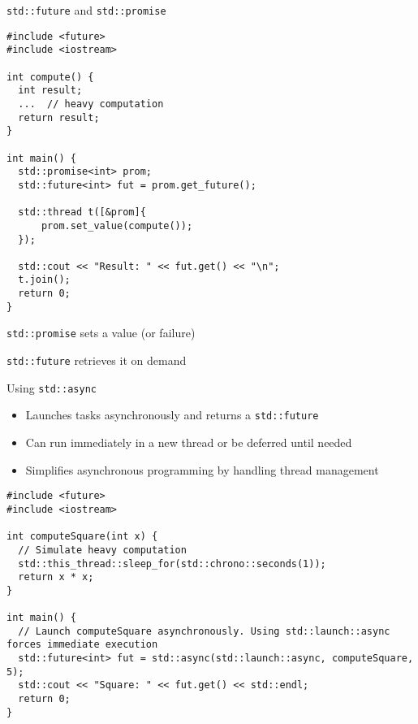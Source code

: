 \documentclass{beamer}
\begin{document}
\begin{frame}[fragile]{\texttt{std::future} and \texttt{std::promise}}
  \lstset{style=CStyle}
  \begin{lstlisting}
#include <future>
#include <iostream>

int compute() {
  int result;
  ...  // heavy computation
  return result;
}

int main() {
  std::promise<int> prom;
  std::future<int> fut = prom.get_future();

  std::thread t([&prom]{
      prom.set_value(compute());
  });

  std::cout << "Result: " << fut.get() << "\n";
  t.join();
  return 0;
}
  \end{lstlisting}

  \texttt{std::promise} sets a value (or failure)

  \texttt{std::future} retrieves it on demand
\end{frame}

\begin{frame}[fragile]{Using \texttt{std::async}}
  \begin{itemize}
    \item Launches tasks asynchronously and returns a \texttt{std::future}
    \item Can run immediately in a new thread or be deferred until needed
    \item Simplifies asynchronous programming by handling thread management
  \end{itemize}
  \lstset{style=CStyle}
  \begin{lstlisting}
#include <future>
#include <iostream>

int computeSquare(int x) {
  // Simulate heavy computation
  std::this_thread::sleep_for(std::chrono::seconds(1));
  return x * x;
}

int main() {
  // Launch computeSquare asynchronously. Using std::launch::async forces immediate execution
  std::future<int> fut = std::async(std::launch::async, computeSquare, 5);
  std::cout << "Square: " << fut.get() << std::endl;
  return 0;
}
  \end{lstlisting}
\end{frame}
\end{document}
